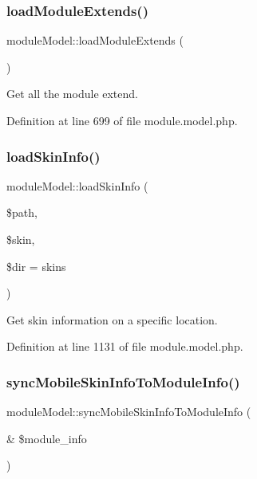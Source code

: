\subsubsection{\texorpdfstring{load\+Module\+Extends()}{loadModuleExtends()}}
{\footnotesize\ttfamily module\+Model\+::load\+Module\+Extends (\begin{DoxyParamCaption}{ }\end{DoxyParamCaption})}



Get all the module extend. 



Definition at line 699 of file module.\+model.\+php.

\mbox{\label{classmoduleModel_a2b655921c58fd41c547b78481d585275}} 
\subsubsection{\texorpdfstring{load\+Skin\+Info()}{loadSkinInfo()}}
{\footnotesize\ttfamily module\+Model\+::load\+Skin\+Info (\begin{DoxyParamCaption}\item[{}]{\$path,  }\item[{}]{\$skin,  }\item[{}]{\$dir = {\ttfamily \textquotesingle{}skins\textquotesingle{}} }\end{DoxyParamCaption})}



Get skin information on a specific location. 



Definition at line 1131 of file module.\+model.\+php.

\mbox{\label{classmoduleModel_ae90cd832480cf8c46e96d95c20a63387}} 
\subsubsection{\texorpdfstring{sync\+Mobile\+Skin\+Info\+To\+Module\+Info()}{syncMobileSkinInfoToModuleInfo()}}
{\footnotesize\ttfamily module\+Model\+::sync\+Mobile\+Skin\+Info\+To\+Module\+Info (\begin{DoxyParamCaption}\item[{\&}]{\$module\+\_\+info }\end{DoxyParamCaption})}


